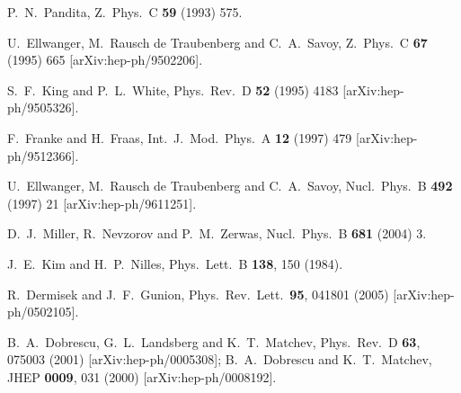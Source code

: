 \documentclass[aps,prl,twocolumn,nofootinbib,superscriptaddress]{revtex4}
\begin{document}
\begin{thebibliography}{99}
  P.~N.~Pandita,
  Z.\ Phys.\  C {\bf 59} (1993) 575.

  U.~Ellwanger, M.~Rausch de Traubenberg and C.~A.~Savoy,
  Z.\ Phys.\  C {\bf 67} (1995) 665
  [arXiv:hep-ph/9502206].

  S.~F.~King and P.~L.~White,
  Phys.\ Rev.\  D {\bf 52} (1995) 4183
  [arXiv:hep-ph/9505326].

  F.~Franke and H.~Fraas,
  Int.\ J.\ Mod.\ Phys.\  A {\bf 12} (1997) 479
  [arXiv:hep-ph/9512366].

  U.~Ellwanger, M.~Rausch de Traubenberg and C.~A.~Savoy,
  Nucl.\ Phys.\  B {\bf 492} (1997) 21
  [arXiv:hep-ph/9611251].


  D.~J.~Miller, R.~Nevzorov and P.~M.~Zerwas,
  Nucl.\ Phys.\  B {\bf 681} (2004) 3.
  
J.~E.~Kim and H.~P.~Nilles,
  Phys.\ Lett.\  B {\bf 138}, 150 (1984).

  R.~Dermisek and J.~F.~Gunion,
  Phys.\ Rev.\ Lett.\  {\bf 95}, 041801 (2005)
  [arXiv:hep-ph/0502105].

B.~A.~Dobrescu, G.~L.~Landsberg and K.~T.~Matchev,
  Phys.\ Rev.\  D {\bf 63}, 075003 (2001)
  [arXiv:hep-ph/0005308];
%
 B.~A.~Dobrescu and K.~T.~Matchev,
  JHEP {\bf 0009}, 031 (2000)
  [arXiv:hep-ph/0008192].
  

\end{thebibliography}
\end{document}

